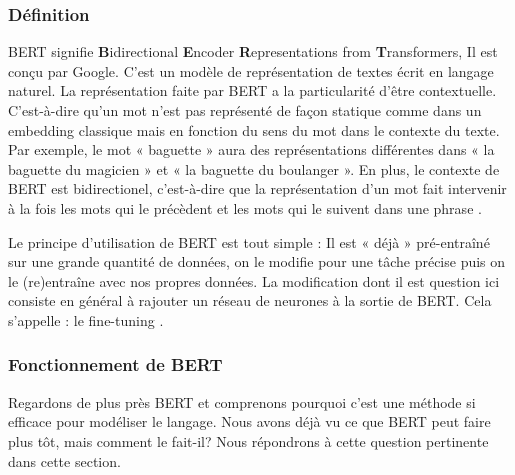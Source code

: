         \subsubsection{Définition }
        \par BERT signifie \textbf{B}idirectional \textbf{E}ncoder \textbf{R}epresentations from \textbf{T}ransformers, Il est conçu par Google. C'est un modèle de représentation de textes écrit en langage naturel. La représentation faite par BERT a la particularité d’être contextuelle. C’est-à-dire qu’un mot n’est pas représenté de façon statique comme dans un embedding classique mais en fonction du sens du mot dans le contexte du texte. Par exemple, le mot « baguette » aura des représentations différentes dans « la baguette du magicien » et « la baguette du boulanger ». En plus, le contexte de BERT est bidirectionel, c’est-à-dire que la représentation d’un mot fait intervenir à la fois les mots qui le précèdent et les mots qui le suivent dans une phrase \cite{ch2ref21,ch2ref20,ch2ref16}.
        
        \par Le principe d’utilisation de BERT est tout simple : Il est « déjà » pré-entraîné sur une grande quantité de données, on le modifie pour une tâche précise puis on le (re)entraîne avec nos propres données. La modification dont il est question ici consiste en général à rajouter un réseau de neurones à la sortie de BERT. Cela s’appelle : le fine-tuning \cite{ch2bert,ch2ref21,ch2ref16}.
        
        \subsubsection{Fonctionnement de BERT }
        \par Regardons de plus près BERT et comprenons pourquoi c’est une méthode si efficace pour modéliser le langage. Nous avons déjà vu ce que BERT peut faire plus tôt, mais comment le fait-il? Nous répondrons à cette question pertinente dans cette section. \cite{ch2ref16}
            
